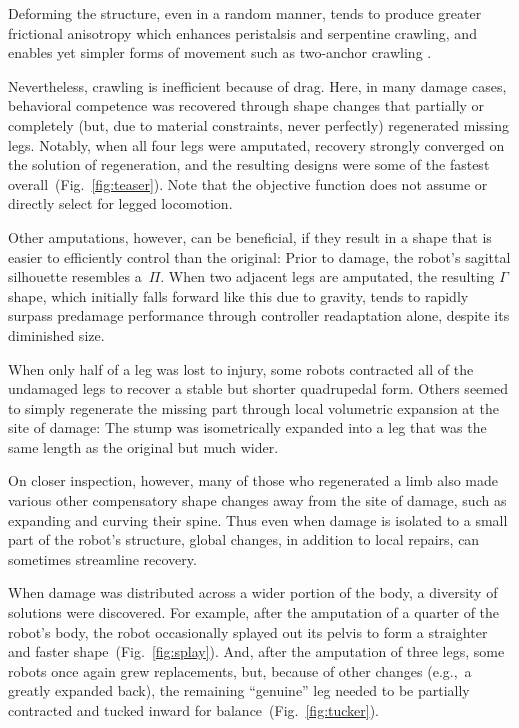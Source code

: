 Deforming the structure, even in a random manner, tends to produce greater frictional anisotropy which enhances peristalsis and serpentine crawling, and enables yet simpler forms of movement such as two-anchor crawling \cite{alexander2003principles}.

Nevertheless, crawling is inefficient because of drag.
Here, in many damage cases, behavioral competence was recovered through shape changes that partially or completely (but, due to material constraints, never perfectly) regenerated missing legs.
Notably, when all four legs were amputated, recovery strongly converged on the solution of regeneration, and the resulting designs were some of the fastest overall~(Fig.~\ref{fig:teaser}).
Note that the objective function does not assume or directly select for legged locomotion.


Other amputations, however, can be beneficial, if they result in a shape that is easier to efficiently control than the original:
Prior to damage, the robot's sagittal silhouette resembles a~$\Pi$.
When two adjacent legs are amputated, the resulting $\Gamma$ shape, which initially falls forward like this  due to gravity, tends to rapidly surpass predamage performance through controller readaptation alone, despite its diminished size.

When only half of a leg was lost to injury, some robots contracted all of the undamaged legs to recover a stable but shorter quadrupedal form.
Others seemed to simply regenerate the missing part through local volumetric expansion at the site of damage:
The stump was isometrically expanded into a leg that was the same length as the original but much wider.

On closer inspection, however, many of those who regenerated a limb also made various other compensatory shape changes away from the site of damage, such as expanding and curving their spine.
Thus even when damage is isolated to a small part of the robot's structure,
global changes, in addition to local repairs, can sometimes streamline recovery.


When damage was distributed across a wider portion of the body, a diversity of solutions were discovered.
For example, after the amputation of a quarter of the robot's body, the robot occasionally splayed out its pelvis to form a straighter and faster shape~(Fig.~\ref{fig:splay}).
And, after the amputation of three legs, some robots once again grew replacements, but, because of other changes (e.g.,~a greatly expanded back),
the remaining ``genuine'' leg needed to be partially contracted and tucked inward for balance~(Fig.~\ref{fig:tucker}).

